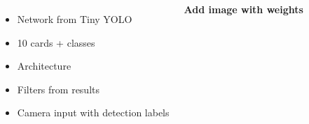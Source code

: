 \documentclass[25pt, a0paper, landscape]{tikzposter}
\begin{document}
\begin{columns}
{\begin{minipage}{\columnwidth}
\begin{minipage}{500 pt}
\begin{itemize}
					        		\item Network from Tiny YOLO
					        		
					        		\item 10 cards + classes
					        		
					        		\item Architecture
					        		
					        		
					        		\item Filters from results
					        		
					        		\item Camera input with detection labels
					        	\end{itemize}
			    		  	\end{minipage}
			\end{minipage}
			\bfseries Add image with weights
        }
\end{columns}
\end{document}
